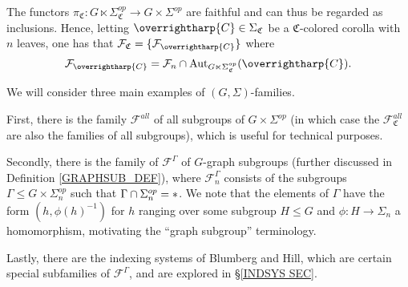 \documentclass[a4paper,10pt
,draft
]{article}%
\renewcommand{\F}{\mathcal F}
\renewcommand{\1}{\eta}%
\newcommand{\vect}[1]{\text{\overrightharp{\ensuremath{#1}}}}
\begin{document}
\begin{remark}
The functors
$\pi_{\mathfrak{C}} \colon
G \ltimes \Sigma_{\mathfrak{C}}^{op} \to
G \times \Sigma^{op}$
are faithful and can thus be regarded as inclusions.
Hence, letting $\vect{C} \in \Sigma_{\mathfrak{C}}$ be a
$\mathfrak{C}$-colored corolla with $n$ leaves,
one has that
$\F_{\mathfrak{C}} = \{\F_{\vect{C}}\}$ where
\begin{equation}\label{FAMC_DEF_EQ}
	\F_{\vect{C}} = \F_n \cap \Aut_{G \ltimes \Sigma_{\mathfrak C}^{op}}(\vect C).
\end{equation}
\end{remark}


We will consider three main examples of $(G,\Sigma)$-families.

First, there is the family $\F^{all}$ of all subgroups of $G \times \Sigma^{op}$
(in which case the $\F^{all}_{\mathfrak{C}}$ are also the families of all subgroups), which is useful for technical purposes.

Secondly, there is the family of $\F^{\Gamma}$
of $G$-graph subgroups (further discussed in Definition \ref{GRAPHSUB_DEF}), where $\F^{\Gamma}_n$
consists of the subgroups
$\Gamma \leq G \times \Sigma_n^{op}$
such that $\Gamma \cap \Sigma_n^{op} = \**$.
We note that the elements of $\Gamma$
have the form $(h,\phi(h)^{-1})$
for $h$ ranging over some subgroup $H \leq G$
and $\phi \colon H \to \Sigma_n$
a homomorphism,
motivating the ``graph subgroup'' terminology.

Lastly, there are the indexing systems of Blumberg and Hill,
which are certain special subfamilies of $\F^{\Gamma}$,
and are explored in \S \ref{INDSYS SEC}.
\end{document}
